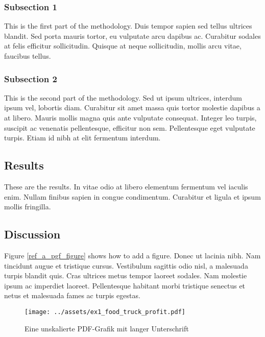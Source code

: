 \hypertarget{subsection-1}{%
\subsubsection{Subsection 1}\label{subsection-1}}

This is the first part of the methodology. Duis tempor sapien sed
tellus ultrices blandit. Sed porta mauris tortor, eu vulputate arcu
dapibus ac. Curabitur sodales at felis efficitur sollicitudin.
Quisque at neque sollicitudin, mollis arcu vitae, faucibus tellus.

\hypertarget{subsection-2-1}{%
\subsubsection{Subsection 2}\label{subsection-2-1}}

This is the second part of the methodology. Sed ut ipsum ultrices,
interdum ipsum vel, lobortis diam. Curabitur sit amet massa quis
tortor molestie dapibus a at libero. Mauris mollis magna quis ante
vulputate consequat. Integer leo turpis, suscipit ac venenatis
pellentesque, efficitur non sem. Pellentesque eget vulputate turpis.
Etiam id nibh at elit fermentum interdum.

\hypertarget{results-1}{%
\subsection{Results}\label{results-1}}

These are the results. In vitae odio at libero elementum fermentum
vel iaculis enim. Nullam finibus sapien in congue condimentum.
Curabitur et ligula et ipsum mollis fringilla.

\hypertarget{discussion-1}{%
\subsection{Discussion}\label{discussion-1}}

Figure \ref{ref_a_pgf_figure} shows how to add a figure. Donec ut
lacinia nibh. Nam tincidunt augue et tristique cursus. Vestibulum
sagittis odio nisl, a malesuada turpis blandit quis. Cras ultrices
metus tempor laoreet sodales. Nam molestie ipsum ac imperdiet
laoreet. Pellentesque habitant morbi tristique senectus et netus et
malesuada fames ac turpis egestas.

\begin{figure}[htbp]
\hypertarget{ref_a_pdf_figure}{%
\centering
\texttt{[image: ../assets/ex1\_food\_truck\_profit.pdf]}
\caption[Eine unskalierte PDF-Grafik]{Eine unskalierte PDF-Grafik mit langer Unterschrift
\autocite[vgl.][13]{Perez_PythonEcosystem_2011}}\label{ref_a_pdf_figure}
}
\end{figure}

